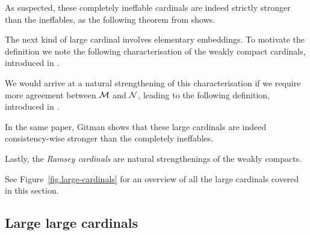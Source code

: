 \documentclass[../../main]{subfiles}
\begin{document}

As suspected, these completely ineffable cardinals are indeed strictly stronger than the ineffables, as the following theorem from \cite{Abramson} shows.


The next kind of large cardinal involves elementary embeddings. To motivate the definition we note the following characterisation of the weakly compact cardinals, introduced in \cite{Hauser}.


We would arrive at a natural strengthening of this characterisation if we require more agreement between $\operatorname{\mathcal M}$ and $\operatorname{\mathcal N}$, leading to the following definition, introduced in \cite{Ramsey1}.


In the same paper, Gitman shows that these large cardinals are indeed consistency-wise stronger than the completely ineffables.


Lastly, the \textit{Ramsey cardinals} are natural strengthenings of the weakly compacts.


See Figure~\ref{fig.large-cardinals} for an overview of all the large cardinals covered in this section.

\subsection{Large large cardinals}
\end{document}
